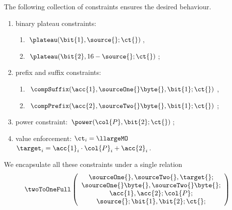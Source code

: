 The following collection of constraints ensures the desired behaviour.
\begin{enumerate}
	\item binary plateau constraints:
		\begin{enumerate}
			\item $\plateau(\bit{1}, \source{}\mark{};\ct{})$,
			\item $\plateau(\bit{2}, 16 - \source{}\mark{};\ct{})$;
		\end{enumerate}
	\item prefix and suffix constraints:
		\begin{enumerate}
			\item $\compSuffix(\acc{1}, \sourceOne{}\byte{}, \bit{1};\ct{})$, %
			\item $\compPrefix(\acc{2}, \sourceTwo{}\byte{}, \bit{1};\ct{})$; %
		\end{enumerate}
	\item power constraint: $\power(\col{P}, \bit{2};\ct{})$;
	\item value enforcement: \If $\ct_{i} = \llargeMO$ \Then $\target_i = \acc{1}_i \cdot \col{P}_i + \acc{2}_i$.
\end{enumerate}
We encapsulate all these constraints under a single relation
\[
	\twoToOneFull
	\left( \begin{array}{c}
		\sourceOne{}, \sourceTwo{}, \target{};\\
		\sourceOne{}\byte{}, \sourceTwo{}\byte{};\\
		\acc{1}, \acc{2}; \col{P}; \\
		\source{}\mark{}; \bit{1}, \bit{2}; \ct{};
	\end{array} \right)
\]

